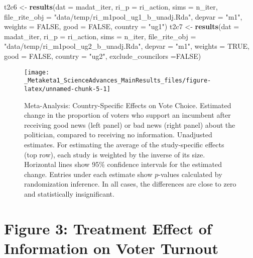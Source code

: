 \documentclass[]{article}
\newenvironment{Shaded}{\begin{snugshade}}{\end{snugshade}}
\newcommand{\KeywordTok}[1]{\textcolor[rgb]{0.13,0.29,0.53}{\textbf{{#1}}}}
\newcommand{\DataTypeTok}[1]{\textcolor[rgb]{0.13,0.29,0.53}{{#1}}}
\newcommand{\StringTok}[1]{\textcolor[rgb]{0.31,0.60,0.02}{{#1}}}
\newcommand{\OtherTok}[1]{\textcolor[rgb]{0.56,0.35,0.01}{{#1}}}
\newcommand{\NormalTok}[1]{{#1}}
\begin{document}
\begin{Shaded}
\begin{Highlighting}[]
  \NormalTok{t2c6 <-}\StringTok{ }\KeywordTok{results}\NormalTok{(}\DataTypeTok{dat =} \NormalTok{madat_iter, }\DataTypeTok{ri_p =} \NormalTok{ri_action, }\DataTypeTok{sims =} \NormalTok{n_iter,}
                  \DataTypeTok{file_rite_obj =} \StringTok{"data/temp/ri_m1pool_ug1_b_unadj.Rda"}\NormalTok{,}
                  \DataTypeTok{depvar =} \StringTok{"m1"}\NormalTok{, }\DataTypeTok{weights =} \OtherTok{FALSE}\NormalTok{, }\DataTypeTok{good =} \OtherTok{FALSE}\NormalTok{, }\DataTypeTok{country =} \StringTok{"ug1"}\NormalTok{)}
  \NormalTok{t2c7 <-}\StringTok{ }\KeywordTok{results}\NormalTok{(}\DataTypeTok{dat =} \NormalTok{madat_iter, }\DataTypeTok{ri_p =} \NormalTok{ri_action, }\DataTypeTok{sims =} \NormalTok{n_iter,}
                  \DataTypeTok{file_rite_obj =} \StringTok{"data/temp/ri_m1pool_ug2_b_unadj.Rda"}\NormalTok{,}
                  \DataTypeTok{depvar =} \StringTok{"m1"}\NormalTok{, }\DataTypeTok{weights =} \OtherTok{TRUE}\NormalTok{,  }\DataTypeTok{good =} \OtherTok{FALSE}\NormalTok{, }\DataTypeTok{country =} \StringTok{"ug2"}\NormalTok{, }
                  \DataTypeTok{exclude_councilors =}\OtherTok{FALSE}\NormalTok{)}
\end{Highlighting}
\end{Shaded}

\begin{figure}

{\centering \texttt{[image: \_Metaketa1\_ScienceAdvances\_MainResults\_files/figure-latex/unnamed-chunk-5-1]} 

}

\caption{Meta-Analysis: Country-Specific Effects on Vote Choice. Estimated change in the proportion of voters who support an incumbent after receiving good news (left panel) or bad news (right panel) about the politician, compared to receiving no information. Unadjusted estimates. For estimating the average of the study-specific effects (top row), each study is weighted by the inverse of its size. Horizontal lines show 95\% confidence intervals for the estimated change. Entries under each estimate show $p$-values calculated by randomization inference. In all cases, the differences are close to zero and statistically insignificant.}\label{fig:unnamed-chunk-5}
\end{figure}

\clearpage

\section{Figure 3: Treatment Effect of Information on Voter
Turnout}\label{figure-3-treatment-effect-of-information-on-voter-turnout}
\end{document}
